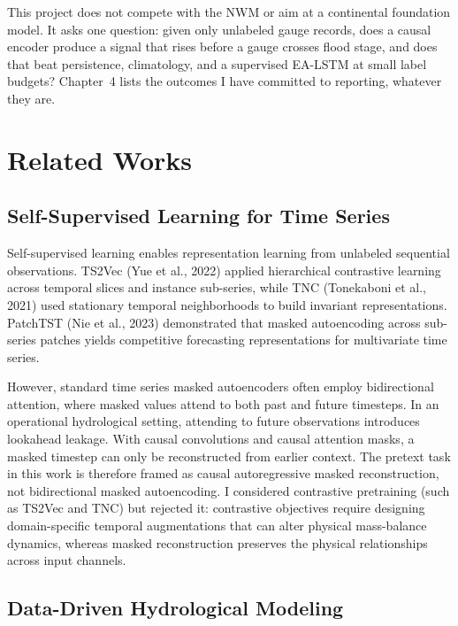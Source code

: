 \documentclass[12pt]{report}
\begin{document}
This project does not compete with the NWM or aim at a continental foundation model. It asks one question: given only unlabeled gauge records, does a causal encoder produce a signal that rises before a gauge crosses flood stage, and does that beat persistence, climatology, and a supervised EA-LSTM at small label budgets? Chapter~4 lists the outcomes I have committed to reporting, whatever they are.


\chapter{Related Works}

\section{Self-Supervised Learning for Time Series}

Self-supervised learning enables representation learning from unlabeled sequential observations. TS2Vec (Yue et al., 2022) applied hierarchical contrastive learning across temporal slices and instance sub-series, while TNC (Tonekaboni et al., 2021) used stationary temporal neighborhoods to build invariant representations. PatchTST (Nie et al., 2023) demonstrated that masked autoencoding across sub-series patches yields competitive forecasting representations for multivariate time series.

However, standard time series masked autoencoders often employ bidirectional attention, where masked values attend to both past and future timesteps. In an operational hydrological setting, attending to future observations introduces lookahead leakage. With causal convolutions and causal attention masks, a masked timestep can only be reconstructed from earlier context. The pretext task in this work is therefore framed as causal autoregressive masked reconstruction, not bidirectional masked autoencoding. I considered contrastive pretraining (such as TS2Vec and TNC) but rejected it: contrastive objectives require designing domain-specific temporal augmentations that can alter physical mass-balance dynamics, whereas masked reconstruction preserves the physical relationships across input channels.

\section{Data-Driven Hydrological Modeling}
\end{document}
